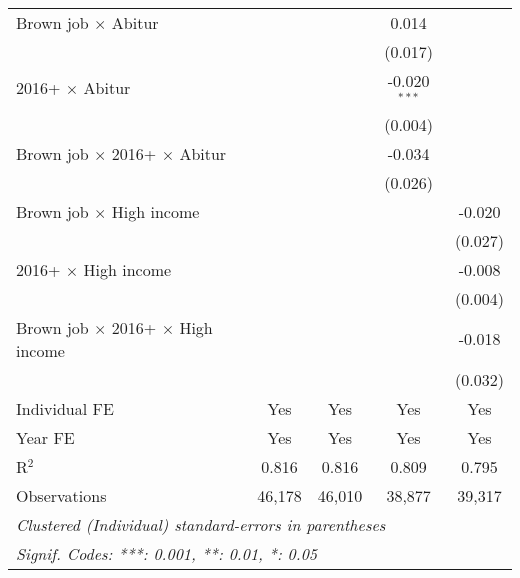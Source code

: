 \begin{table}[htbp]
\begin{tabular}{lcccc}
      Brown job $\times$ Abitur                       &                &              & 0.014          &   \\   
                                                      &                &              & (0.017)        &   \\   
      2016+ $\times$ Abitur                           &                &              & -0.020$^{***}$ &   \\   
                                                      &                &              & (0.004)        &   \\   
      Brown job $\times$ 2016+ $\times$ Abitur        &                &              & -0.034         &   \\   
                                                      &                &              & (0.026)        &   \\   
      Brown job $\times$ High income                  &                &              &                & -0.020\\   
                                                      &                &              &                & (0.027)\\   
      2016+ $\times$ High income                      &                &              &                & -0.008\\   
                                                      &                &              &                & (0.004)\\   
      Brown job $\times$ 2016+ $\times$ High income   &                &              &                & -0.018\\   
                                                      &                &              &                & (0.032)\\   
      Individual FE                                   & Yes            & Yes          & Yes            & Yes\\  
      Year FE                                         & Yes            & Yes          & Yes            & Yes\\  
      R$^2$                                           & 0.816          & 0.816        & 0.809          & 0.795\\  
      Observations                                    & 46,178         & 46,010       & 38,877         & 39,317\\  
      \midrule \midrule
      \multicolumn{5}{l}{\emph{Clustered (Individual) standard-errors in parentheses}}\\
      \multicolumn{5}{l}{\emph{Signif. Codes: ***: 0.001, **: 0.01, *: 0.05}}\\
   \end{tabular}
\end{table}


